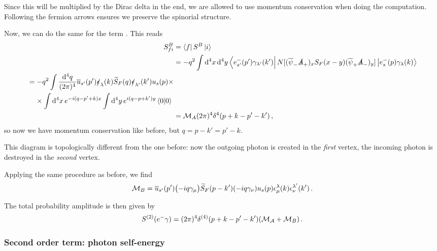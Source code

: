 \documentclass[main.tex]{subfiles}
\begin{document}
Since this will be multiplied by the Dirac delta in the end, we are allowed to use momentum conservation when doing the computation. 
Following the fermion arrows ensures we preserve the spinorial structure. 

Now, we can do the same for the term . This reads 
\begin{align}
S^{B}_{fi} &= \bra{f} S^{B} \ket{i}  \\
&= - q^2 \int \dd[4]{x} \dd[4]{y} 
\bra{e^{-}_{s'} (p') \gamma_{\lambda'} (k')} 
N [(\overline{\psi}_{-} \slashed{A}_{+})_{x} S_F (x-y) (\overline{\psi}_{+} \slashed{A}_{-})_{y}]
\ket{e^{-}_{s} (p) \gamma_\lambda (k)}  \\
\begin{split}
&= -q^2 \int \frac{ \dd[4]{q}}{(2 \pi )^{4}} \overline{u}_{s'} (p') \slashed{\epsilon }_{\lambda} (k) \widetilde{S}_{F} (q) \slashed{\epsilon }_{\lambda' } (k') u_s (p) \times \\
&\phantom{=}\  \times \int \dd[4]{x} e^{-i (q - p' + k )x}
\int \dd[4]{y} e^{i (q-p +k') y} \braket{0}{0} 
\end{split}  \\
&= \mathcal{M}_{A} (2 \pi )^{4} \delta^{4} (p + k - p' - k') 
\,,
\end{align}
%
so now we have momentum conservation like before, but \(q = p - k' = p' - k\). 

This diagram is topologically different from the one before: now the outgoing photon is created in the \emph{first} vertex, the incoming photon is destroyed in the \emph{second} vertex.

Applying the same procedure as before, we find 
%
\begin{align}
\mathcal{M}_{B} = \overline{u}_{s'} (p') \qty(-iq \gamma_{\mu })
\widetilde{S}_{F} (p - k') \qty(-i q \gamma_{\nu }) u_s (p) 
\epsilon^{\lambda }_{\mu } (k) \epsilon^{\lambda '}_{\nu } (k')
\,.
\end{align}

The total probability amplitude is then given by 
%
\begin{align}
S^{(2)} (e^{-} \gamma ) = (2\pi )^{4} \delta^{(4)}
(p + k - p' - k') \qty(\mathcal{M_A} + \mathcal{M}_{B}) 
\,.
\end{align}

\subsubsection{Second order term: photon self-energy}
\end{document}
